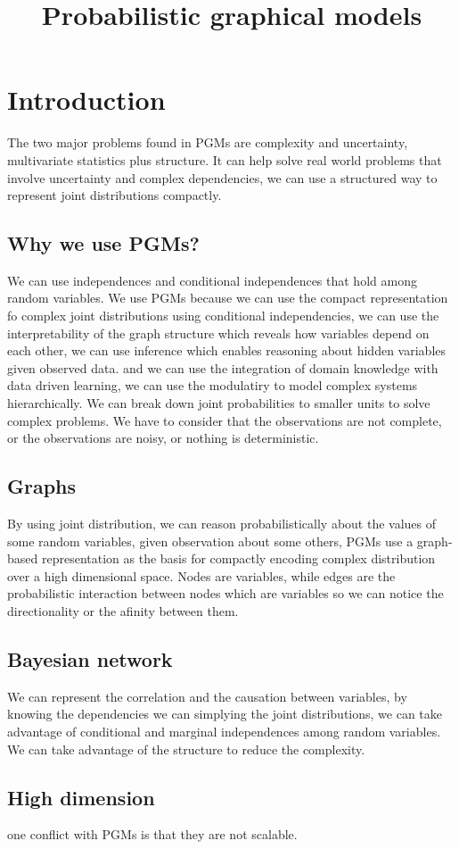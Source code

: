 \documentclass[11pt]{article}
\title{Probabilistic graphical models}
\author{}
\date{}
\begin{document}
\maketitle

\section{Introduction}
The two major problems found in PGMs are complexity and uncertainty, multivariate statistics plus structure. It can help solve real world problems that involve uncertainty and complex dependencies, we can use a structured way to represent joint distributions compactly.
\subsection{Why we use PGMs?}
We can use independences and conditional independences that hold among random variables. We use PGMs because we can use the compact representation fo complex joint distributions using conditional independencies, we can use the interpretability of the graph structure which reveals how variables depend on each other, we can use inference which enables reasoning about hidden variables given observed data. and we can use the integration of domain knowledge with data driven learning, we can use the modulatiry to model complex systems hierarchically. We can break down joint probabilities to smaller units to solve complex problems.
We have to consider that the observations are not complete, or the observations are noisy, or nothing is deterministic.
\subsection{Graphs}
By using joint distribution, we can reason probabilistically about the values of some random variables, given observation about some others, PGMs use a graph-based representation as the basis for compactly encoding complex distribution over a high dimensional space.
Nodes are variables, while edges are the probabilistic interaction between nodes which are variables so we can notice the directionality or the afinity between them. 

\subsection{Bayesian network}
We can represent the correlation and the causation between variables, by knowing the dependencies we can simplying the joint distributions, we can take advantage of conditional and marginal independences among random variables. We can take advantage of the structure to reduce the complexity.
\subsection{High dimension}
one conflict with PGMs is that they are not scalable.
\end{document}
